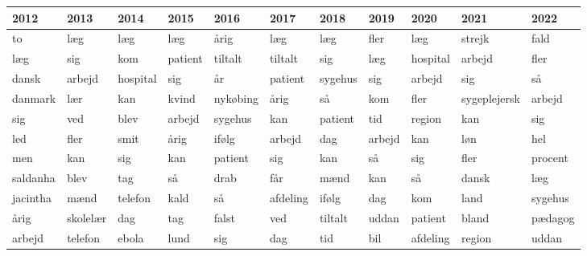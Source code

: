\begin{tabular}{lllllllllll}
\toprule
    2012 &     2013 &     2014 &    2015 &     2016 &     2017 &    2018 &   2019 &     2020 &         2021 &    2022 \\
\midrule
      to &      læg &      læg &     læg &     årig &      læg &     læg &   fler &      læg &       strejk &    fald \\
     læg &      sig &      kom & patient &  tiltalt &  tiltalt &     sig &    læg & hospital &       arbejd &    fler \\
   dansk &   arbejd & hospital &     sig &       år &  patient & sygehus &    sig &   arbejd &          sig &      så \\
 danmark &      lær &      kan &   kvind & nykøbing &     årig &      så &    kom &     fler & sygeplejersk &  arbejd \\
     sig &      ved &     blev &  arbejd &  sygehus &      kan & patient &    tid &   region &          kan &     sig \\
     led &     fler &     smit &    årig &    ifølg &   arbejd &     dag & arbejd &      kan &          løn &     hel \\
     men &      kan &      sig &     kan &  patient &      sig &     kan &     så &      sig &         fler & procent \\
saldanha &     blev &      tag &      så &     drab &      får &    mænd &    kan &       så &        dansk &     læg \\
jacintha &     mænd &  telefon &    kald &       så & afdeling &   ifølg &    dag &      kom &         land & sygehus \\
    årig & skolelær &      dag &     tag &    falst &      ved & tiltalt &  uddan &  patient &        bland & pædagog \\
  arbejd &  telefon &    ebola &    lund &      sig &      dag &     tid &    bil & afdeling &       region &   uddan \\
\bottomrule
\end{tabular}
